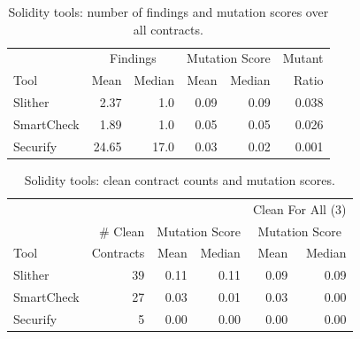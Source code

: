 \begin{table}
  \begin{tabular}{l|r|r|r|r|r}
    & \multicolumn{2}{|c|}{Findings} & \multicolumn{2}{|c|}{Mutation Score}  & Mutant \\
    Tool & Mean & Median & Mean & Median & Ratio\\
    \hline
    \hline
    Slither & 2.37 & 1.0 & 0.09 & 0.09 & 0.038 \\
    \hline
    SmartCheck & 1.89 & 1.0 & 0.05 & 0.05 & 0.026 \\
    \hline
    Securify & 24.65 & 17.0 & 0.03 & 0.02 &  0.001 \\
    \hline
  \end{tabular}
  \caption{Solidity tools: number of findings and mutation scores over all contracts.}
  \label{tab:scoresolidity}
\end{table}

\begin{table}
  \begin{tabular}{l|r|r|r|r|r}
    & & \multicolumn{2}{|c|}{} & \multicolumn{2}{|c}{Clean For All (3)} \\
    & \# Clean & \multicolumn{2}{|c|}{Mutation Score} &  \multicolumn{2}{|c}{Mutation Score}\\
    Tool & Contracts & Mean & Median & Mean & Median\\
    \hline
    \hline
    Slither & 39 & 0.11 & 0.11 & 0.09 & 0.09 \\
    \hline
    SmartCheck & 27 & 0.03 & 0.01 & 0.03 & 0.00 \\
    \hline
    Securify & 5 & 0.00 & 0.00 & 0.00 & 0.00 \\
    \hline
  \end{tabular}
  \caption{Solidity tools: clean contract counts and mutation scores.}
  \label{tab:cleansolidity}
\end{table}


